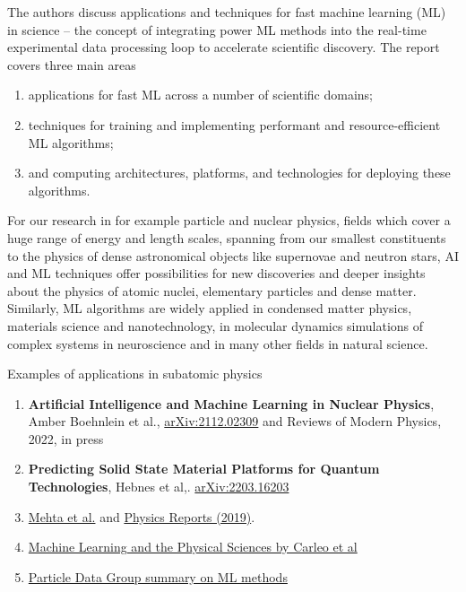 \documentclass[%
oneside,                 %
final,                   %
10pt]{article}
\begin{document}
The authors discuss applications and techniques for fast machine
learning (ML) in science -- the concept of integrating power ML
methods into the real-time experimental data processing loop to
accelerate scientific discovery. The report covers three main areas

\begin{enumerate}
\item applications for fast ML across a number of scientific domains;

\item techniques for training and implementing performant and resource-efficient ML algorithms;

\item and computing architectures, platforms, and technologies for deploying these algorithms.
\end{enumerate}

\noindent
For our research in for example particle and
nuclear physics, fields which cover a huge range of energy and length scales,
spanning from our smallest constituents to the physics of dense
astronomical objects like supernovae and neutron stars, AI and ML
techniques offer possibilities for new discoveries and deeper insights
about the physics of atomic nuclei, elementary particles and dense
matter. Similarly, ML algorithms are widely applied in condensed
matter physics, materials science and nanotechnology, in molecular dynamics simulations of complex
systems in neuroscience and in many other fields in natural science.

Examples of applications in subatomic physics
\begin{enumerate}
\item \textbf{Artificial Intelligence and Machine Learning in Nuclear Physics}, Amber Boehnlein et al., \href{{https://arxiv.org/abs/2112.02309}}{arXiv:2112.02309} and Reviews of Modern Physics, 2022, in press

\item \textbf{Predicting Solid State Material Platforms for Quantum Technologies}, Hebnes et al,. \href{{https://arxiv.org/abs/2203.16203}}{arXiv:2203.16203}

\item \href{{https://arxiv.org/abs/1803.08823}}{Mehta et al.} and \href{{https://www.sciencedirect.com/science/article/pii/S0370157319300766?via%3Dihub}}{Physics Reports (2019)}.

\item \href{{https://link.aps.org/doi/10.1103/RevModPhys.91.045002}}{Machine Learning and the Physical Sciences by Carleo et al}

\item \href{{https://pdg.lbl.gov/2021/reviews/rpp2021-rev-machine-learning.pdf}}{Particle Data Group summary on ML methods}
\end{enumerate}
\end{document}
